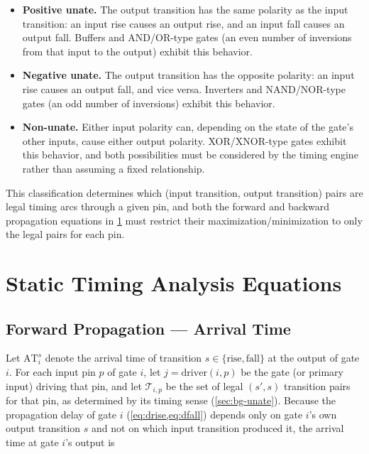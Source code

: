 \begin{itemize}
    \item \textbf{Positive unate.} The output transition has the same
          polarity as the input transition: an input rise causes an output
          rise, and an input fall causes an output fall. Buffers and
          AND/OR-type gates (an even number of inversions from that input
          to the output) exhibit this behavior.
    \item \textbf{Negative unate.} The output transition has the opposite
          polarity: an input rise causes an output fall, and vice versa.
          Inverters and NAND/NOR-type gates (an odd number of inversions)
          exhibit this behavior.
    \item \textbf{Non-unate.} Either input polarity can, depending on the
          state of the gate's other inputs, cause either output polarity.
          XOR/XNOR-type gates exhibit this behavior, and both possibilities
          must be considered by the timing engine rather than assuming a
          fixed relationship.
\end{itemize}

This classification determines which (input transition, output transition)
pairs are legal timing arcs through a given pin, and both the forward and
backward propagation equations in \cref{sec:bg-sta} must restrict their
maximization/minimization to only the legal pairs for each pin.

\section{Static Timing Analysis Equations}
\label{sec:bg-sta}

\subsection{Forward Propagation --- Arrival Time}
\label{sec:bg-sta-forward}

Let $\mathrm{AT}_i^{s}$ denote the arrival time of transition $s \in
\{\mathrm{rise}, \mathrm{fall}\}$ at the output of gate $i$. For each input
pin $p$ of gate $i$, let $j = \mathrm{driver}(i,p)$ be the gate (or primary
input) driving that pin, and let $\mathcal{T}_{i,p}$ be the set of legal
$(s', s)$ transition pairs for that pin, as determined by its timing sense
(\cref{sec:bg-unate}). Because the propagation delay of gate $i$
(\cref{eq:drise,eq:dfall}) depends only on gate $i$'s own output transition
$s$ and not on which input transition produced it, the arrival time at gate
$i$'s output is

